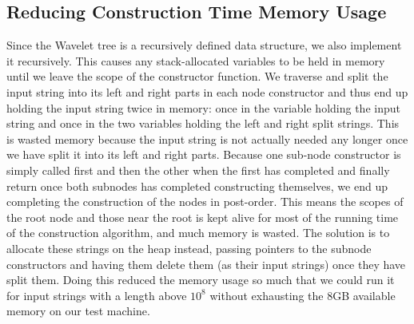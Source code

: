 \subsection{Reducing Construction Time Memory Usage}
Since the Wavelet tree is a recursively defined data structure, we also implement it recursively.
This causes any stack-allocated variables to be held in memory until we leave the scope of the constructor function.
We traverse and split the input string into its left and right parts in each node constructor and thus end up holding the input string twice in memory: once in the variable holding the input string and once in the two variables holding the left and right split strings.
This is wasted memory because the input string is not actually needed any longer once we have split it into its left and right parts.
Because one sub-node constructor is simply called first and then the other when the first has completed and finally return once both subnodes has completed constructing themselves, we end up completing the construction of the nodes in post-order.
This means the scopes of the root node and those near the root is kept alive for most of the running time of the construction algorithm, and much memory is wasted.
The solution is to allocate these strings on the heap instead, passing pointers to the subnode constructors and having them delete them (as their input strings) once they have split them.
Doing this reduced the memory usage so much that we could run it for input strings with a length above $10^8$ without exhausting the 8GB available memory on our test machine.


